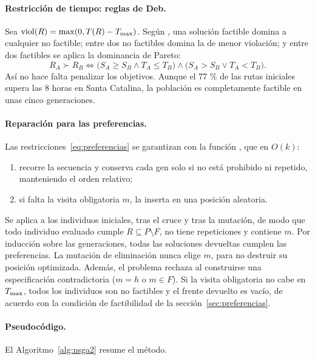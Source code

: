 \paragraph{Restricción de tiempo: reglas de Deb.} Sea $\mathrm{viol}(R) = \max(0, T(R) - T_{\max})$. Según \citet{deb2000}, una solución factible domina a cualquier no factible; entre dos no factibles domina la de menor violación; y entre dos factibles se aplica la dominancia de Pareto:
\begin{equation}
  R_A \succ R_B \iff \bigl(S_A \ge S_B \wedge T_A \le T_B\bigr) \wedge \bigl(S_A > S_B \vee T_A < T_B\bigr).
\end{equation}
Así no hace falta penalizar los objetivos. Aunque el 77 \% de las rutas iniciales supera las 8 horas en Santa Catalina, la población es completamente factible en unas cinco generaciones.

\paragraph{Reparación para las preferencias.} Las restricciones~\eqref{eq:preferencias} se garantizan con la función , que en $O(k)$:
\begin{enumerate}
  \item recorre la secuencia y conserva cada gen solo si no está prohibido ni repetido, manteniendo el orden relativo;
  \item si falta la visita obligatoria $m$, la inserta en una posición aleatoria.
\end{enumerate}
Se aplica a los individuos iniciales, tras el cruce y tras la mutación, de modo que todo individuo evaluado cumple $R \subseteq P \setminus F$, no tiene repeticiones y contiene $m$. Por inducción sobre las generaciones, todas las soluciones devueltas cumplen las preferencias. La mutación de eliminación nunca elige $m$, para no destruir su posición optimizada. Además, el problema rechaza al construirse una especificación contradictoria ($m = h$ o $m \in F$). Si la visita obligatoria no cabe en $T_{\max}$, todos los individuos son no factibles y el frente devuelto es vacío, de acuerdo con la condición de factibilidad de la sección~\ref{sec:preferencias}.

\paragraph{Pseudocódigo.} El Algoritmo~\ref{alg:nsga2} resume el método.

